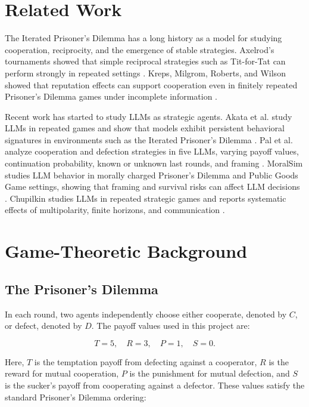 \documentclass[11pt]{article}
\begin{document}
\section{Related Work}

The Iterated Prisoner's Dilemma has a long history as a model for studying cooperation, reciprocity, and the emergence of stable strategies. Axelrod's tournaments showed that simple reciprocal strategies such as Tit-for-Tat can perform strongly in repeated settings \cite{axelrod1984evolution}. Kreps, Milgrom, Roberts, and Wilson showed that reputation effects can support cooperation even in finitely repeated Prisoner's Dilemma games under incomplete information \cite{kreps1982rational}.

Recent work has started to study LLMs as strategic agents. Akata et al. study LLMs in repeated games and show that models exhibit persistent behavioral signatures in environments such as the Iterated Prisoner's Dilemma \cite{akata2023playing}. Pal et al. analyze cooperation and defection strategies in five LLMs, varying payoff values, continuation probability, known or unknown last rounds, and framing \cite{pal2026strategies}. MoralSim studies LLM behavior in morally charged Prisoner's Dilemma and Public Goods Game settings, showing that framing and survival risks can affect LLM decisions \cite{backmann2025ethics}. Chupilkin studies LLMs in repeated strategic games and reports systematic effects of multipolarity, finite horizons, and communication \cite{chupilkin2026strategic}.

\section{Game-Theoretic Background}

\subsection{The Prisoner's Dilemma}

In each round, two agents independently choose either cooperate, denoted by $C$, or defect, denoted by $D$. The payoff values used in this project are:

\[
T = 5, \quad R = 3, \quad P = 1, \quad S = 0.
\]

Here, $T$ is the temptation payoff from defecting against a cooperator, $R$ is the reward for mutual cooperation, $P$ is the punishment for mutual defection, and $S$ is the sucker's payoff from cooperating against a defector. These values satisfy the standard Prisoner's Dilemma ordering:
\end{document}
